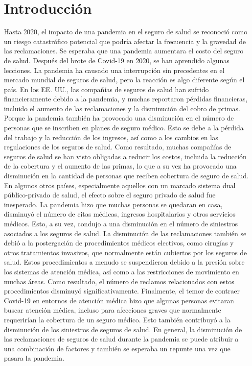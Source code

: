 \documentclass[12pt,twoside]{article} %
\begin{document}
\buecereportheaders

\setcounter{page}{1}

\section{Introducción}  %
Hasta 2020, el impacto de una pandemia en el seguro de salud se reconoció como un riesgo catastrófico potencial que podría afectar la frecuencia y la gravedad de las reclamaciones. Se esperaba que una pandemia aumentara el costo del seguro de salud.
Después del brote de Covid-19 en 2020, se han aprendido algunas lecciones. La pandemia ha causado una interrupción sin precedentes en el mercado mundial de seguros de salud, pero la reacción es algo diferente según el país. En los EE. UU., las compañías de seguros de salud han sufrido financieramente debido a la pandemia, y muchas reportaron pérdidas financieras, incluido el aumento de las reclamaciones y la disminución del cobro de primas. Porque la pandemia también ha provocado una disminución en el número de personas que se inscriben en planes de seguro médico. Esto se debe a la pérdida del trabajo y la reducción de los ingresos, así como a los cambios en las regulaciones de los seguros de salud. Como resultado, muchas compañías de seguros de salud se han visto obligadas a reducir los costos, incluida la reducción de la cobertura y el aumento de las primas, lo que a su vez ha provocado una disminución en la cantidad de personas que reciben cobertura de seguro de salud.
En algunos otros países, especialmente aquellos con un marcado sistema dual público-privado de salud, el efecto sobre el seguro privado de salud fue inesperado. La pandemia hizo que muchas personas se quedaran en casa, disminuyó el número de citas médicas, ingresos hospitalarios y otros servicios médicos. Esto, a su vez, condujo a una disminución en el número de siniestros asociados a los seguros de salud. La disminución de las reclamaciones también se debió a la postergación de procedimientos médicos electivos, como cirugías y otros tratamientos invasivos, que normalmente están cubiertos por los seguros de salud. Estos procedimientos a menudo se suspendieron debido a la presión sobre los sistemas de atención médica, así como a las restricciones de movimiento en muchas áreas. Como resultado, el número de reclamos relacionados con estos procedimientos disminuyó significativamente. Finalmente, el temor de contraer Covid-19 en entornos de atención médica hizo que algunas personas evitaran buscar atención médica, incluso para afecciones graves que normalmente requerirían la cobertura de un seguro médico. Esto también contribuyó a la disminución de los siniestros de seguros de salud. En general, la disminución de las reclamaciones de seguros de salud durante la pandemia se puede atribuir a una combinación de factores y también se esperaba un repunte una vez que pasara la pandemia.
\end{document}
